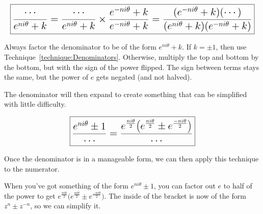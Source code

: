 \documentclass[../main.tex]{subfile}
\begin{document}

$$\Large \boxed{\frac{\cdots}{e^{ni\theta} + k}
= \frac{\cdots}{e^{ni\theta} + k} \times \frac{e^{-ni\theta} + k}{e^{-ni\theta} + k}
= \frac{(e^{-ni\theta} + k) (\cdots)}{(e^{ni\theta} + k) (e^{-ni\theta} + k)}}$$

Always factor the denominator to be of the form $e^{ni\theta} + k$. If $k = \pm 1$, then use Technique~\ref{technique:Denominators}. Otherwise, multiply the top and bottom by the bottom, but with the sign of the power flipped. The sign between terms stays the same, but the power of $e$ gets negated (and not halved).

The denominator will then expand to create something that can be simplified with little difficulty.


$$\Large \boxed{\frac{e^{ni\theta} \pm 1}{\cdots}
= \frac{e^\frac{ni\theta}{2} \big(e^\frac{ni\theta}{2} \pm e^\frac{-ni\theta}{2}\big)}{\cdots}}$$

Once the denominator is in a manageable form, we can then apply this technique to the numerator.

When you've got something of the form $\displaystyle e^{ni\theta} \pm 1$, you can factor out $e$ to half of the power to get $\displaystyle e^\frac{ni\theta}{2} \big(e^\frac{ni\theta}{2} \pm e^\frac{-ni\theta}{2}\big)$. The inside of the bracket is now of the form $z^n \pm z^{-n}$, so we can simplify it.
\end{document}
